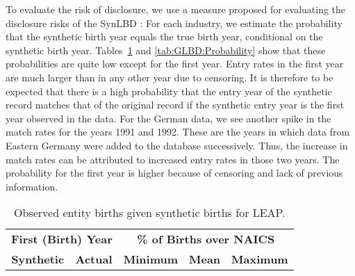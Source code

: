 
To evaluate the risk of disclosure, we use a measure proposed for evaluating the disclosure risks of the SynLBD \citep{KinneyEtAl2011}: For each industry, we estimate the probability that the synthetic birth year equals the true birth year, conditional on the synthetic birth year. Tables~\ref{tab:Can:ProbabilityPrivate} and \ref{tab:GLBD:Probability} show that these probabilities are quite low except for the first year. Entry rates in the first year are much larger than in any other year due to censoring. It is therefore to be expected that there is a high probability that the entry year of the synthetic record matches that of the original record if the synthetic entry year is the first year observed in the data. For the German data, we see another spike in the match rates for the years 1991 and 1992. These are the years in which data from Eastern Germany were added to the database successively. Thus, the increase in match rates can be attributed to increased entry rates in those two years. 
  The probability for the first year is higher because of censoring and lack of previous information.

\begin{table}[H]
\centering\footnotesize
\caption{Observed entity births given synthetic births for LEAP.} \label{tab:Can:ProbabilityPrivate} \medskip
\renewcommand{\arraystretch}{1}
\begin{tabular}{c c| c c c}
\toprule
\multicolumn{2}{c|}{\textbf{First (Birth) Year}} &  \multicolumn{3}{c}{\textbf{\% of Births over NAICS}}\\
\textbf{Synthetic}&\textbf{Actual}&\textbf{Minimum}&\textbf{Mean}&\textbf{Maximum}\\
\midrule

\bottomrule
\end{tabular} 
\\
\justify
\end{table}

%

